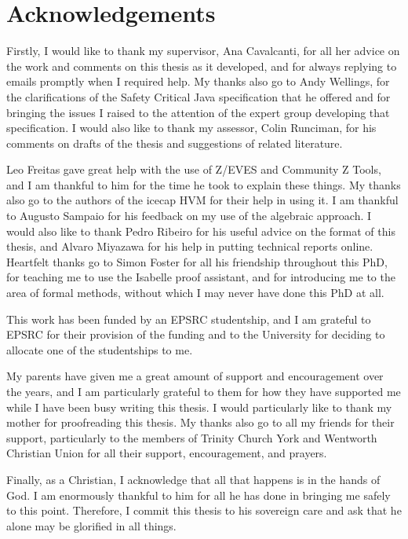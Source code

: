 \documentclass[a4paper,11pt]{report}
\begin{document}
\cleardoublepage
{}
{}
\chapter*{Acknowledgements}

Firstly, I would like to thank my supervisor, Ana Cavalcanti, for all
her advice on the work and comments on this thesis as it developed,
and for always replying to emails promptly when I required help.
My thanks also go to Andy Wellings, for the clarifications of the
Safety Critical Java specification that he offered and for bringing
the issues I raised to the attention of the expert group developing
that specification.
I would also like to thank my assessor, Colin Runciman, for his
comments on drafts of the thesis and suggestions of related
literature.

Leo Freitas gave great help with the use of Z/EVES and Community Z
Tools, and I am thankful to him for the time he took to explain these
things.
My thanks also go to the authors of the icecap HVM for their help in
using it.
I am thankful to Augusto Sampaio for his feedback on my use of the
algebraic approach.
I would also like to thank Pedro Ribeiro for his useful advice on the
format of this thesis, and Alvaro Miyazawa for his help in putting
technical reports online.
Heartfelt thanks go to Simon Foster for all his friendship throughout
this PhD, for teaching me to use the Isabelle proof assistant, and for
introducing me to the area of formal methods, without which I may
never have done this PhD at all.

This work has been funded by an EPSRC studentship, and I am grateful to
EPSRC for their provision of the funding and to the University for
deciding to allocate one of the studentships to me.

My parents have given me a great amount of support and encouragement
over the years, and I am particularly grateful to them for how they
have supported me while I have been busy writing this thesis. 
I would particularly like to thank my mother for proofreading this
thesis.
My thanks also go to all my friends for their support, particularly to
the members of Trinity Church York and Wentworth Christian Union for
all their support, encouragement, and prayers.

Finally, as a Christian, I acknowledge that all that happens is in the
hands of God. 
I am enormously thankful to him for all he has done in bringing me
safely to this point. 
Therefore, I commit this thesis to his sovereign care and ask that he
alone may be glorified in all things.
\end{document}
